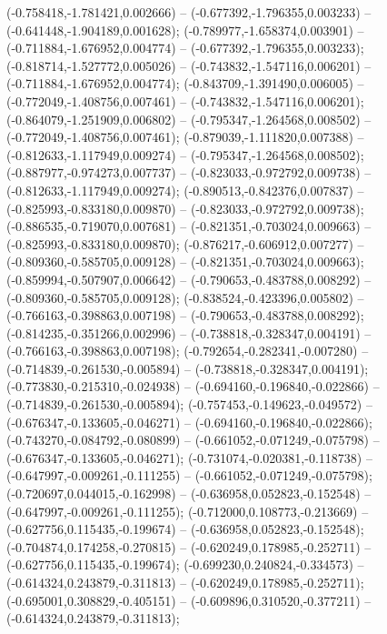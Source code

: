  (-0.758418,-1.781421,0.002666) -- (-0.677392,-1.796355,0.003233) -- (-0.641448,-1.904189,0.001628);
 (-0.789977,-1.658374,0.003901) -- (-0.711884,-1.676952,0.004774) -- (-0.677392,-1.796355,0.003233);
 (-0.818714,-1.527772,0.005026) -- (-0.743832,-1.547116,0.006201) -- (-0.711884,-1.676952,0.004774);
 (-0.843709,-1.391490,0.006005) -- (-0.772049,-1.408756,0.007461) -- (-0.743832,-1.547116,0.006201);
 (-0.864079,-1.251909,0.006802) -- (-0.795347,-1.264568,0.008502) -- (-0.772049,-1.408756,0.007461);
 (-0.879039,-1.111820,0.007388) -- (-0.812633,-1.117949,0.009274) -- (-0.795347,-1.264568,0.008502);
 (-0.887977,-0.974273,0.007737) -- (-0.823033,-0.972792,0.009738) -- (-0.812633,-1.117949,0.009274);
 (-0.890513,-0.842376,0.007837) -- (-0.825993,-0.833180,0.009870) -- (-0.823033,-0.972792,0.009738);
 (-0.886535,-0.719070,0.007681) -- (-0.821351,-0.703024,0.009663) -- (-0.825993,-0.833180,0.009870);
 (-0.876217,-0.606912,0.007277) -- (-0.809360,-0.585705,0.009128) -- (-0.821351,-0.703024,0.009663);
 (-0.859994,-0.507907,0.006642) -- (-0.790653,-0.483788,0.008292) -- (-0.809360,-0.585705,0.009128);
 (-0.838524,-0.423396,0.005802) -- (-0.766163,-0.398863,0.007198) -- (-0.790653,-0.483788,0.008292);
 (-0.814235,-0.351266,0.002996) -- (-0.738818,-0.328347,0.004191) -- (-0.766163,-0.398863,0.007198);
 (-0.792654,-0.282341,-0.007280) -- (-0.714839,-0.261530,-0.005894) -- (-0.738818,-0.328347,0.004191);
 (-0.773830,-0.215310,-0.024938) -- (-0.694160,-0.196840,-0.022866) -- (-0.714839,-0.261530,-0.005894);
 (-0.757453,-0.149623,-0.049572) -- (-0.676347,-0.133605,-0.046271) -- (-0.694160,-0.196840,-0.022866);
 (-0.743270,-0.084792,-0.080899) -- (-0.661052,-0.071249,-0.075798) -- (-0.676347,-0.133605,-0.046271);
 (-0.731074,-0.020381,-0.118738) -- (-0.647997,-0.009261,-0.111255) -- (-0.661052,-0.071249,-0.075798);
 (-0.720697,0.044015,-0.162998) -- (-0.636958,0.052823,-0.152548) -- (-0.647997,-0.009261,-0.111255);
 (-0.712000,0.108773,-0.213669) -- (-0.627756,0.115435,-0.199674) -- (-0.636958,0.052823,-0.152548);
 (-0.704874,0.174258,-0.270815) -- (-0.620249,0.178985,-0.252711) -- (-0.627756,0.115435,-0.199674);
 (-0.699230,0.240824,-0.334573) -- (-0.614324,0.243879,-0.311813) -- (-0.620249,0.178985,-0.252711);
 (-0.695001,0.308829,-0.405151) -- (-0.609896,0.310520,-0.377211) -- (-0.614324,0.243879,-0.311813);
